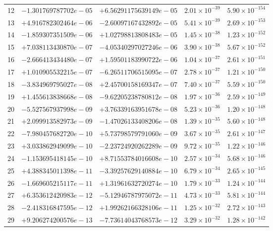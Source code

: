 \documentclass[11pt]{article}
\begin{document}
\begin{longtable}{rllll}
12 & $-1.301769787702e-05$ & $+6.56291175639149e-05$ & $2.01 \times 10^{-39}$ & $5.90 \times 10^{-154}$ \\
13 & $+4.916782302464e-06$ & $-2.60097167432892e-05$ & $5.41 \times 10^{-39}$ & $2.69 \times 10^{-153}$ \\
14 & $-1.859307351509e-06$ & $+1.02798813808483e-05$ & $1.45 \times 10^{-38}$ & $1.23 \times 10^{-152}$ \\
15 & $+7.038113430870e-07$ & $-4.05340297027246e-06$ & $3.90 \times 10^{-38}$ & $5.67 \times 10^{-152}$ \\
16 & $-2.666413434480e-07$ & $+1.59501183990722e-06$ & $1.04 \times 10^{-37}$ & $2.61 \times 10^{-151}$ \\
17 & $+1.010905532215e-07$ & $-6.26511706515095e-07$ & $2.78 \times 10^{-37}$ & $1.21 \times 10^{-150}$ \\
18 & $-3.834969795027e-08$ & $+2.45700158169347e-07$ & $7.40 \times 10^{-37}$ & $5.59 \times 10^{-150}$ \\
19 & $+1.455613838668e-08$ & $-9.62205238780812e-08$ & $1.97 \times 10^{-36}$ & $2.59 \times 10^{-149}$ \\
20 & $-5.527567937998e-09$ & $+3.76339163951678e-08$ & $5.23 \times 10^{-36}$ & $1.20 \times 10^{-148}$ \\
\midrule
21 & $+2.099913582973e-09$ & $-1.47026133408206e-08$ & $1.39 \times 10^{-35}$ & $5.60 \times 10^{-148}$ \\
22 & $-7.980457682720e-10$ & $+5.73798579791060e-09$ & $3.67 \times 10^{-35}$ & $2.61 \times 10^{-147}$ \\
23 & $+3.033862949099e-10$ & $-2.23724920262289e-09$ & $9.72 \times 10^{-35}$ & $1.22 \times 10^{-146}$ \\
24 & $-1.153695418145e-10$ & $+8.71553784016608e-10$ & $2.57 \times 10^{-34}$ & $5.68 \times 10^{-146}$ \\
25 & $+4.388345011398e-11$ & $-3.39257629140884e-10$ & $6.79 \times 10^{-34}$ & $2.65 \times 10^{-145}$ \\
26 & $-1.669605215117e-11$ & $+1.31961632720274e-10$ & $1.79 \times 10^{-33}$ & $1.24 \times 10^{-144}$ \\
27 & $+6.353612420983e-12$ & $-5.12946787975072e-11$ & $4.73 \times 10^{-33}$ & $5.81 \times 10^{-144}$ \\
28 & $-2.418316847595e-12$ & $+1.99262166328106e-11$ & $1.25 \times 10^{-32}$ & $2.72 \times 10^{-143}$ \\
29 & $+9.206274200576e-13$ & $-7.73614043768573e-12$ & $3.29 \times 10^{-32}$ & $1.28 \times 10^{-142}$ \\

\end{longtable}
\end{document}
